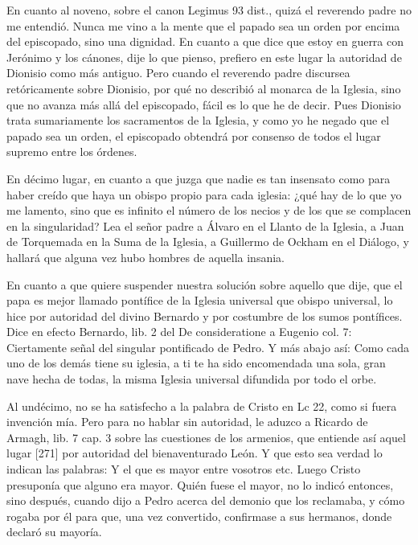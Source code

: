 En cuanto al noveno, sobre el canon Legimus 93 dist., quizá el reverendo padre no me entendió. Nunca me vino a la mente que el papado sea un orden por encima del episcopado, sino una dignidad. En cuanto a que dice que estoy en guerra con Jerónimo y los cánones, dije lo que pienso, prefiero en este lugar la autoridad de Dionisio como más antiguo. Pero cuando el reverendo padre discursea retóricamente sobre Dionisio, por qué no describió al monarca de la Iglesia, sino que no avanza más allá del episcopado, fácil es lo que he de decir. Pues Dionisio trata sumariamente los sacramentos de la Iglesia, y como yo he negado que el papado sea un orden, el episcopado obtendrá por consenso de todos el lugar supremo entre los órdenes.

En décimo lugar, en cuanto a que juzga que nadie es tan insensato como para haber creído que haya un obispo propio para cada iglesia: ¿qué hay de lo que yo me lamento, sino que es infinito el número de los necios y de los que se complacen en la singularidad? Lea el señor padre a Álvaro en el Llanto de la Iglesia, a Juan de Torquemada en la Suma de la Iglesia, a Guillermo de Ockham en el Diálogo, y hallará que alguna vez hubo hombres de aquella insania.

En cuanto a que quiere suspender nuestra solución sobre aquello que dije, que el papa es mejor llamado pontífice de la Iglesia universal que obispo universal, lo hice por autoridad del divino Bernardo y por costumbre de los sumos pontífices. Dice en efecto Bernardo, lib. 2 del De consideratione a Eugenio col. 7: Ciertamente señal del singular pontificado de Pedro. Y más abajo así: Como cada uno de los demás tiene su iglesia, a ti te ha sido encomendada una sola, gran nave hecha de todas, la misma Iglesia universal difundida por todo el orbe.

Al undécimo, no se ha satisfecho a la palabra de Cristo en Lc 22, como si fuera invención mía. Pero para no hablar sin autoridad, le aduzco a Ricardo de Armagh, lib. 7 cap. 3 sobre las cuestiones de los armenios, que entiende así aquel lugar [271] por autoridad del bienaventurado León. Y que esto sea verdad lo indican las palabras: Y el que es mayor entre vosotros etc. Luego Cristo presuponía que alguno era mayor. Quién fuese el mayor, no lo indicó entonces, sino después, cuando dijo a Pedro acerca del demonio que los reclamaba, y cómo rogaba por él para que, una vez convertido, confirmase a sus hermanos, donde declaró su mayoría.

